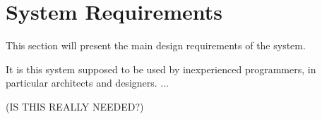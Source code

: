 

\section{System Requirements} %
\label{sec:system_requirements}
This section will present the main design requirements of the system.

It is this system supposed to be used by inexperienced programmers, in particular architects and designers.
...



(IS THIS REALLY NEEDED?)




